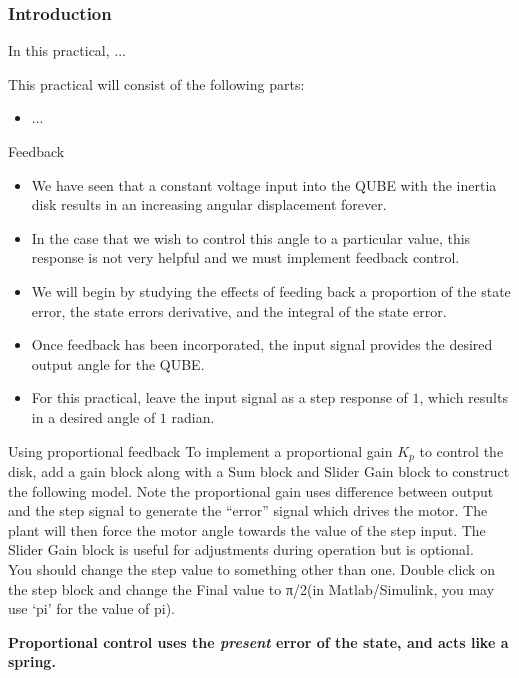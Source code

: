 \documentclass[9pt]{beamer-control}
\begin{document}

\begin{frame}
\frametitle{Introduction}
In this practical, ...

\vfill

This practical will consist of the following parts:
\begin{itemize}
\item ...
\end{itemize}
\end{frame}



\begin{frame}{Feedback}
\begin{itemize}
\item We have seen that a constant voltage input into the QUBE with the inertia disk results in an increasing angular displacement forever. 
\item In the case that we wish to control this angle to a particular value, this response is not very helpful and we must implement feedback control. 
\item We will begin by studying the effects of feeding back a proportion of the state error, the state errors derivative, and the integral of the state error. 
\item Once feedback has been incorporated, the input signal provides the desired output angle for the QUBE. 
\item For this practical, leave the input signal as a step response of $1$, which results in a desired angle of $1$ radian.
\end{itemize}
\end{frame}

\begin{frame}{Using proportional feedback}
To implement a proportional gain $K_p$ to control the disk, add a gain block along with a Sum block and Slider Gain block to construct the following model. Note the proportional gain uses difference between output and the step signal to generate the “error” signal which drives the motor. The plant will then force the motor angle towards the value of the step input. The Slider Gain block is useful for adjustments during operation but is optional.\\

You should change the step value to something other than one. Double click on the step block and change the Final value to π/2(in Matlab/Simulink, you may use ‘pi’ for the value of pi).
	

\textbf{Proportional control uses the \textit{present} error of the state, and acts like a spring.}
	
\end{frame}
\end{document}
